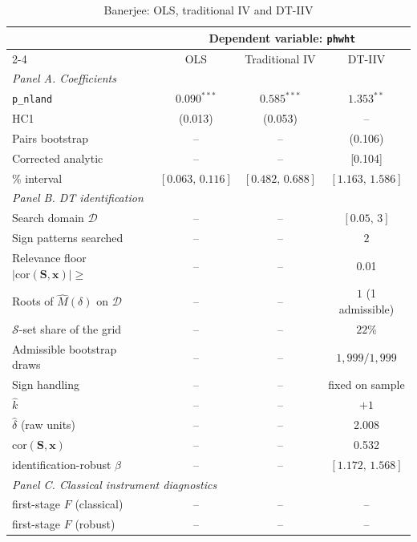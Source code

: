 \begin{table}[htbp]
\centering
\caption{Banerjee: OLS, traditional IV and DT-IIV}
\label{tab:banerjee_results}
\begin{threeparttable}
\begin{tabular}{lccc}
\toprule
& \multicolumn{3}{c}{Dependent variable: \texttt{phwht}} \\
\cmidrule(lr){2-4}
 & OLS & Traditional IV & DT-IIV \\
\midrule
\multicolumn{4}{l}{\emph{Panel A. Coefficients}} \\
\texttt{p\_nland} & $0.090^{***}$ & $0.585^{***}$ & $1.353^{**}$ \\
\quad HC1 & (0.013) & (0.053) & -- \\
\quad Pairs bootstrap & -- & -- & (0.106) \\
\quad Corrected analytic & -- & -- & [0.104] \\
\quad 95\% interval & $[0.063,\,0.116]$ & $[0.482,\,0.688]$ & $[1.163,\,1.586]$ \\[3pt]
\midrule
\multicolumn{4}{l}{\emph{Panel B. DT identification}} \\
\quad Search domain $\mathcal D$ & -- & -- & $[0.05,\,3]$ \\
\quad Sign patterns searched & -- & -- & $2$ \\
\quad Relevance floor $|\mathrm{cor}(\mathbf S,\mathbf x)|\ge$ & -- & -- & 0.01 \\
\quad Roots of $\widehat M(\delta)$ on $\mathcal D$ & -- & -- & $1$ (1 admissible) \\
\quad $\mathcal S$-set share of the grid & -- & -- & $22$\% \\
\quad Admissible bootstrap draws & -- & -- & $1{,}999/1{,}999$ \\
\quad Sign handling & -- & -- & fixed on sample \\
\quad $\widehat k$ & -- & -- & $+1$ \\
\quad $\widehat\delta$ (raw units) & -- & -- & 2.008 \\
\quad $\mathrm{cor}(\mathbf S,\mathbf x)$ & -- & -- & 0.532 \\
\quad identification-robust $\beta$ & -- & -- & $[1.172,\,1.568]$ \\[3pt]
\midrule
\multicolumn{4}{l}{\emph{Panel C. Classical instrument diagnostics}} \\
\quad first-stage $F$ (classical) & -- & -- & -- \\
\quad first-stage $F$ (robust) & -- & -- & -- \\

\end{tabular}
\end{threeparttable}
\end{table}
